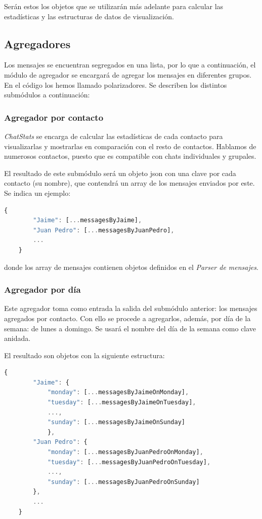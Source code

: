 Serán estos los objetos que se utilizarán más adelante para calcular las estadísticas y las estructuras de datos de visualización.

\subsection{Agregadores}

Los mensajes se encuentran segregados en una lista, por lo que a continuación, el módulo de agregador se encargará de agregar los mensajes en diferentes grupos. En el código los hemos llamado polarizadores. Se describen los distintos submódulos a continuación:

\subsubsection{Agregador por contacto}

\textit{ChatStats} se encarga de calcular las estadísticas de cada contacto para visualizarlas y mostrarlas en comparación con el resto de contactos. Hablamos de numerosos contactos, puesto que es compatible con chats individuales y grupales.

El resultado de este submódulo será un objeto \acrshort{json} con una clave por cada contacto (su nombre), que contendrá un array de los mensajes enviados por este. Se indica un ejemplo:

\begin{lstlisting}[language=JavaScript]
	{
		"Jaime": [...messagesByJaime],
		"Juan Pedro": [...messagesByJuanPedro],
		...
	}
\end{lstlisting}

donde los array de mensajes contienen objetos definidos en el \textit{Parser de mensajes}.

\subsubsection{Agregador por día}

Este agregador toma como entrada la salida del submódulo anterior: los mensajes agregados por contacto. Con ello se procede a agregarlos, además, por día de la semana: de lunes a domingo. Se usará el nombre del día de la semana como clave anidada.

El resultado son objetos con la siguiente estructura:

\begin{lstlisting}[language=JavaScript]
	{
		"Jaime": {
			"monday": [...messagesByJaimeOnMonday],
			"tuesday": [...messagesByJaimeOnTuesday],
			...,
			"sunday": [...messagesByJaimeOnSunday]
			},
		"Juan Pedro": {
			"monday": [...messagesByJuanPedroOnMonday],
			"tuesday": [...messagesByJuanPedroOnTuesday],
			...,
			"sunday": [...messagesByJuanPedroOnSunday]
		},
		...
	}
\end{lstlisting}

